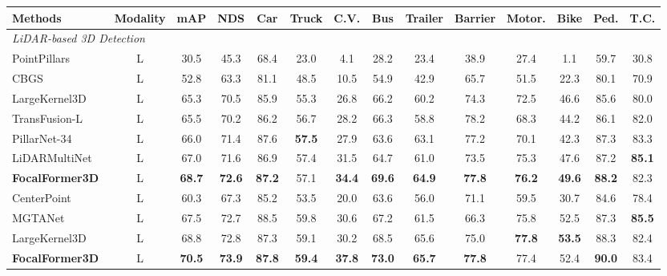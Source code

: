 \documentclass[10pt,twocolumn,letterpaper]{article}
\begin{document}
\begin{table*}[bpt]
	\begin{center}
		\begin{adjustbox}{width=1.\textwidth}
		\begin{tabular}{lccccccccccccc}
			\toprule
			Methods & Modality & mAP & NDS & Car & Truck & C.V. & Bus & Trailer & Barrier & Motor. & Bike & Ped. & T.C. \\ \midrule \midrule
                \multicolumn{5}{l}{\textit{LiDAR-based 3D Detection}} \\
                \midrule
			PointPillars \cite{pointpillar} & L & 30.5 & 45.3 & 68.4 & 23.0 & 4.1 & 28.2 & 23.4 & 38.9 & 27.4 & 1.1 & 59.7 & 30.8 \\
			CBGS \cite{cbgs} & L & 52.8 & 63.3 & 81.1 & 48.5 & 10.5 & 54.9 & 42.9 & 65.7 & 51.5 & 22.3 & 80.1 & 70.9 \\
			LargeKernel3D \cite{largekernel3d} & L & 65.3 & 70.5 & 85.9 & 55.3 & 26.8 & 66.2 & 60.2 & 74.3 & 72.5 & 46.6 & 85.6 & 80.0 \\
			TransFusion-L \cite{transfusion} & L & 65.5 & 70.2 & 86.2 & 56.7 & 28.2 & 66.3 & 58.8 & 78.2 & 68.3 & 44.2 & 86.1 & 82.0 \\
                PillarNet-34~\cite{shi2022pillarnet} & L & 66.0 & 71.4 & 87.6 &\textbf{57.5} & 27.9 & 63.6 & 63.1 & 77.2 & 70.1 & 42.3 & 87.3 & 83.3 \\
            LiDARMultiNet~\ \cite{ye2022lidarmultinet} & L & 67.0 & 71.6 & 86.9 & 57.4 & 31.5 & 64.7 & 61.0 & 73.5 & 75.3 & 47.6 & 87.2 & \textbf{85.1} \\ 
			\textbf{FocalFormer3D} & L & \textbf{68.7} & \textbf{72.6} & \textbf{87.2} & 57.1 & \textbf{34.4} & \textbf{69.6} & \textbf{64.9} & 
            \textbf{77.8} & \textbf{76.2} & \textbf{49.6} & \textbf{88.2} & 82.3
                 \\ \midrule
			CenterPoint \cite{centerpoint}  & L & 60.3 & 67.3 & 85.2 & 53.5 & 20.0 & 63.6 & 56.0 & 71.1 & 59.5 & 30.7 & 84.6 & 78.4 \\
                MGTANet~\cite{mgtanet} & L & 67.5 & 72.7 & 88.5 & 59.8 & 30.6 & 67.2 & 61.5 & 66.3 & 75.8 & 52.5 & 87.3 & \textbf{85.5} \\                 LargeKernel3D~\cite{largekernel3d} & L & 68.8 & 72.8 & 87.3 & 59.1 & 30.2 & 68.5 & 65.6 & 75.0 & \textbf{77.8} & \textbf{53.5} & 88.3 & 82.4 \\
                \textbf{FocalFormer3D}  & L & \textbf{70.5} & \textbf{73.9} & \textbf{87.8} & \textbf{59.4} & \textbf{37.8} & \textbf{73.0} & \textbf{65.7} & \textbf{77.8} & 77.4 & 52.4 & \textbf{90.0} & 83.4 \\ 

\end{tabular}
\end{adjustbox}
\end{center}
\end{table*}
\end{document}
